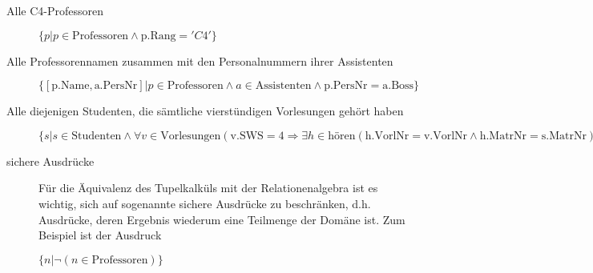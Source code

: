 \documentclass{lehramt-informatik-haupt}
\begin{document}
\begin{description}
\item[Alle C4-Professoren]
$\{p | p \in \text{Professoren} \land \text{p.Rang} = 'C4'\}$

\item[Alle Professorennamen zusammen mit den Personalnummern ihrer
Assistenten]

$\{[\text{p.Name}, \text{a.PersNr}] | p \in \text{Professoren} \land
a \in \text{Assistenten} \land \text{p.PersNr} = \text{a.Boss}\}$

\item[Alle diejenigen Studenten, die sämtliche vierstündigen Vorlesungen
gehört haben]

$\{s | s \in \text{Studenten} \land \forall
v \in \text{Vorlesungen}(\text{v.SWS} = 4 \Rightarrow
\exists h \in \text{hören}(\text{h.VorlNr} = \text{v.VorlNr} \land
\text{h.MatrNr} = \text{s.MatrNr}))\}$

\item[sichere Ausdrücke]

Für die Äquivalenz des Tupelkalküls mit der Relationenalgebra ist es
wichtig, sich auf sogenannte sichere Ausdrücke zu beschränken, d.h.
Ausdrücke, deren Ergebnis wiederum eine Teilmenge der Domäne ist. Zum
Beispiel ist der Ausdruck

$\{n | \neg (n \in \text{Professoren})\}$

\end{description}

\literatur
\end{document}
